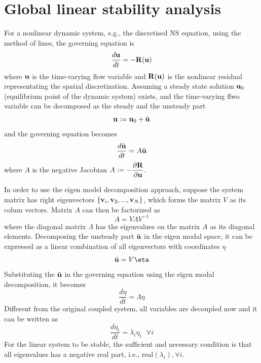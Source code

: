 \documentclass[journal,final]{new-aiaa}
\begin{document}
\section{Global linear stability analysis}
For a nonlinear dynamic system, e.g., the discretised NS equation, using
the method of lines,
the governing equation is
\begin{equation}
\dfrac{d\mathbf{u}}{dt}=-\mathbf{R}(\mathbf{u})
\end{equation}
where $\mathbf{u}$ is the time-varying flow variable and $\mathbf{R}(\mathbf{u})$ is the nonlinear
residual representating the spatial discretization.
Assuming a steady state solution $\mathbf{u}_0$ (equilibrium point of the dynamic system)
exists, and the time-varying flwo variable can be decomposed as the
steady and the unsteady part 
\begin{equation}
\mathbf{u}:=\mathbf{u}_0 + \tilde {\mathbf{u}}
\end{equation}
and the governing equation becomes
\begin{equation}
\dfrac{d \tilde {\mathbf{u}}}{dt}=A \tilde {\mathbf{u}}
\end{equation}
where $A$ is the negative Jacobian $A:=-\dfrac{\partial\mathbf{R}}{\partial\mathbf{u}}$.

In order to use the eigen model decomposition approach, suppose
the system matrix has right eigenvectors $\{\mathbf{v}_i, \mathbf{v}_2, ..., \mathbf{v}_N\}$,
which forms the matrix $V$ as its colum vectors. Matrix $A$ can then
be factorized as 
\begin{equation}
A=V\Lambda V^{-1}
\end{equation}
where the diagonal matrix $\Lambda$ has the eigenvalues on the matrix $A$
as its diagonal elements.
Decomposing the unsteady part $\tilde {\mathbf{u}}$ in the eigen modal space,
it can be expressed as a linear combination of all eigenvectors with
coordinates $\eta$
\begin{equation}
\tilde \uu = V \eta
\end{equation}
Substituting the $\tilde {\mathbf{u}}$ in the governing equation using the eigen modal
decomposition, it becomes
\begin{equation}
\dfrac{d \eta}{dt}= \Lambda \eta
\end{equation}
Different from the original coupled system, all variables are decoupled now and it
can be written as
\begin{equation}
\dfrac{d \eta_i}{dt}= \lambda_i \eta_i  ~~~\forall i
\end{equation}
For the linear system to be stable, the sufficient and necessary condition is
that all eigenvalues has a negative real part, i.e., real$(\lambda_i), \forall i$.
\end{document}
